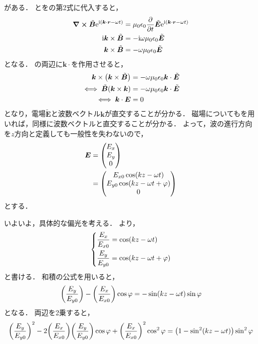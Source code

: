 \documentclass{report}
\begin{document}
    がある．
    とをの第2式に代入すると，
    \begin{align}
      \curl \tilde{\bm{B}}\e^{\i(\bm{k}\cdot \bm{r} - \omega t)} &= \mu_0\epsilon_0\pdv{t}\tilde{\bm{E}}\e^{\i(\bm{k}\cdot \bm{r} - \omega t)} \\ 
      \i\bm{k}\times\tilde{\bm{B}} &= -\i\omega\mu_0\epsilon_0\tilde{\bm{E}} \\ 
      \bm{k}\times\tilde{\bm{B}} &= -\omega\mu_0\epsilon_0\tilde{\bm{E}} \label{electro-magnetic-wave-vertical}
    \end{align}
    となる．
    の両辺に$\bm{k}\cdot$を作用させると，
    \begin{align}
      \bm{k}\times\qty(\bm{k}\times\tilde{\bm{B}}) &= -\omega\mu_0\epsilon_0\bm{k}\cdot\tilde{\bm{E}} \\ 
      \iff \tilde{\bm{B}}\qty(\bm{k}\times\bm{k}) &= -\omega\mu_0\epsilon_0\bm{k}\cdot\tilde{\bm{E}} \\ 
      \iff \bm{k}\cdot \bm{E} &= 0
    \end{align}
    となり，電場$\tilde{\bm{E}}$と波数ベクトル$\bm{k}$が直交することが分かる．
    磁場についてもを用いれば，同様に波数ベクトルと直交することが分かる．
    よって，波の進行方向を$z$方向と定義しても一般性を失わないので，
    \begin{align}
      \bm{E} &= \mqty(E_x \\ E_y \\ 0) \\ 
      &= \mqty(E_{x0}\cos(kz - \omega t) \\ E_{y0}\cos(kz - \omega t + \phi) \\ 0) \label{ex-ey-representation}
    \end{align}
    とする．
    \par
    いよいよ，具体的な偏光を考える．
    より，
    \begin{align}
      \begin{dcases}
        \frac{E_x}{E_{x0}} = \cos(kz - \omega t) \\ 
        \frac{E_y}{E_{y0}} = \cos(kz - \omega t + \phi)
      \end{dcases}
    \end{align}
    と書ける．
    和積の公式を用いると，
    \begin{align}
      \qty(\frac{E_{y}}{E_{y0}}) - \qty(\frac{E_x}{E_{x0}})\cos\phi = -\sin(kz - \omega t)\sin\phi
    \end{align}
    となる．
    両辺を2乗すると，
    \begin{align}
      \qty(\frac{E_{y}}{E_{y0}})^2 - 2\qty(\frac{E_x}{E_{x0}})\qty(\frac{E_{y}}{E_{y0}})\cos\phi + \qty(\frac{E_x}{E_{x0}})^2\cos^2\phi &= \qty(1 - \sin^2(kz - \omega t))\sin^2\phi \\ 
      
    \end{align}
\end{document}
